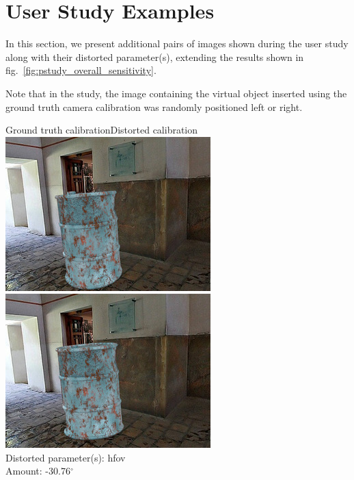 \clearpage

\protect\hypertarget{study}{}{}

\hypertarget{user-study-examples}{%
\section{User Study Examples}\label{user-study-examples}}

In this section, we present additional pairs of images shown during the
user study along with their distorted parameter(s), extending the
results shown in fig.~\ref{fig:pstudy_overall_sensitivity}.

Note that in the study, the image containing the virtual object inserted using the
ground truth camera calibration was randomly positioned left or right.


\begin{minipage}{\linewidth}
\centering
\vspace{1em}
Ground truth calibration\hspace{0.2\linewidth}Distorted calibration\\
\includegraphics[width=0.45\linewidth]{study/thumb/pano_ahxngimugqzaln-1_4_gt.jpg}
\includegraphics[width=0.45\linewidth]{study/thumb/pano_ahxngimugqzaln-1_4_dc.jpg}\\
Distorted parameter(s): hfov\\
Amount: -30.76$^\circ$
\end{minipage}

